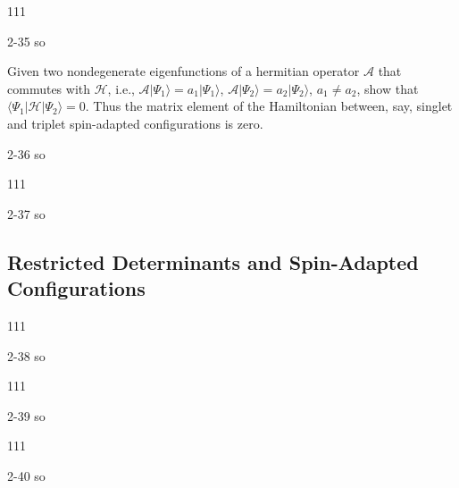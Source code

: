 \documentclass[a4paper]{book}
\begin{document}
	\begin{exercise}
	111
	\end{exercise}
	
	\begin{solution}
		2-35 so
	\end{solution}
	
	\begin{exercise}
	Given two nondegenerate eigenfunctions of a hermitian operator $\mathscr{A}$ that commutes with $\mathscr{H}$, i.e., $\mathscr{A} | \Psi_1 \rangle = a_1 | \Psi_1 \rangle$, $\mathscr{A} | \Psi_2 \rangle = a_2 | \Psi_2 \rangle$, $a_1 \neq a_2$, show that $\langle \Psi_1 | \mathscr{H} | \Psi_2 \rangle = 0$. Thus the matrix element of the Hamiltonian between, say, singlet and triplet spin-adapted configurations is zero.
	\end{exercise}
	
	\begin{solution}
		2-36 so
	\end{solution}
	
	\begin{exercise}
	111
	\end{exercise}
	
	\begin{solution}
		2-37 so
	\end{solution}
	
	\subsection{Restricted Determinants and Spin-Adapted Configurations}
	
	\begin{exercise}
	111
	\end{exercise}
	
	\begin{solution}
		2-38 so
	\end{solution}
	
	\begin{exercise}
	111
	\end{exercise}
	
	\begin{solution}
		2-39 so
	\end{solution}
	
	\begin{exercise}
	111
	\end{exercise}
	
	\begin{solution}
		2-40 so
	\end{solution}
	
\end{document}
